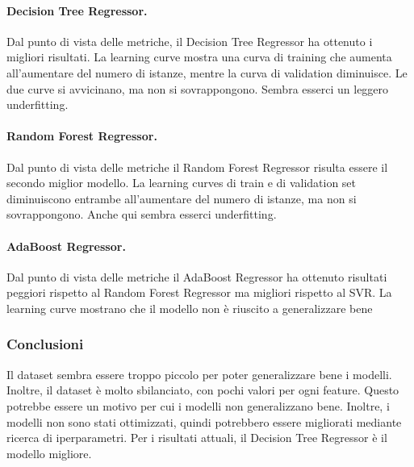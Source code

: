   
    \paragraph{\textbf{Decision Tree Regressor}.}
    Dal punto di vista delle metriche, il Decision Tree Regressor ha ottenuto i migliori risultati. 
    La learning curve mostra una curva di training che aumenta all'aumentare del numero di istanze, mentre la curva di validation diminuisce. Le due curve si avvicinano, ma non si sovrappongono. Sembra esserci un leggero underfitting.
    \paragraph{\textbf{Random Forest Regressor}.}
    Dal punto di vista delle metriche il Random Forest Regressor risulta essere il secondo miglior modello.
    La learning curves di train e di validation set diminuiscono entrambe all'aumentare del numero di istanze, ma non si sovrappongono. Anche qui sembra esserci underfitting.
    \paragraph{\textbf{AdaBoost Regressor}.}
    Dal punto di vista delle metriche il AdaBoost Regressor ha ottenuto risultati peggiori rispetto al Random Forest Regressor ma migliori rispetto al SVR.
    La learning curve mostrano che il modello non è riuscito a generalizzare bene


\subsubsection{Conclusioni}
Il dataset sembra essere troppo piccolo per poter generalizzare bene i modelli. Inoltre, il dataset è molto sbilanciato, con pochi valori per ogni feature. Questo potrebbe essere un motivo per cui i modelli non generalizzano bene. Inoltre, i modelli non sono stati ottimizzati, quindi potrebbero essere migliorati mediante ricerca di iperparametri.
Per i risultati attuali, il Decision Tree Regressor è il modello migliore.